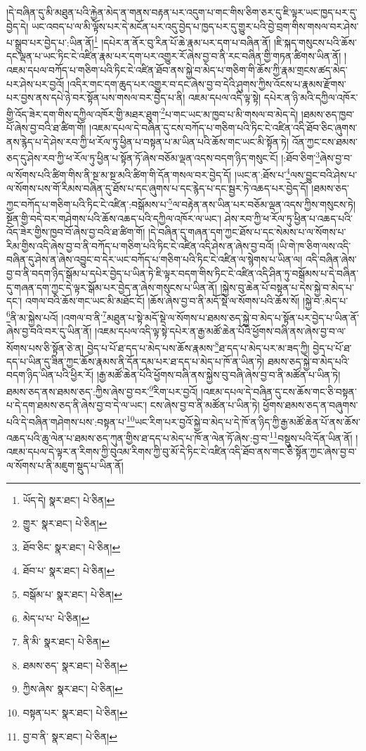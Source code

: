 །དེ་བཞིན་དུ་མི་མཐུན་པའི་རྐྱེན་མེད་ན་གནས་བརྟན་པར་འདུག་པ་གང་གིས་ཅིག་ཅར་དུ་ཇི་ལྟར་ཡང་ཁྱད་པར་དུ་བྱེད་དེ། ཡང་འབད་པ་ལ་མི་ལྟོས་པར་དེ་མངོན་པར་འདུ་བྱེད་པ་ཁྱད་པར་དུ་གྱུར་པའི་བྱེ་བྲག་གིས་གསལ་བར་ཤེས་པ་སྒྲུབ་པར་བྱེད་པ་:ཡིན་ནོ།\footnote{ཡོད་དེ།  སྣར་ཐང་།  པེ་ཅིན། } །དཔེར་ན་ནོར་བུ་རིན་པོ་ཆེ་རྣམ་པར་དག་པ་བཞིན་ནོ། །ཇི་སྐད་གསུངས་པའི་ཆོས་དང་ལྡན་པ་ཡང་ཏིང་ངེ་འཛིན་རྣམ་པར་དག་པར་འགྱུར་རོ་ཞེས་བྱ་བ་ནི་རང་བཞིན་གྱི་གཏན་ཚིགས་ཡིན་ནོ། །འཇམ་དཔལ་བཀོད་པ་གཅིག་པའི་ཏིང་ངེ་འཛིན་ཐོབ་ནས་སྐྱེ་བ་མེད་པ་གཅིག་གི་ཆོས་ཀྱི་རྣམ་གྲངས་ཚད་མེད་པར་ཤེས་པར་བྱའོ། །འདིར་གང་དག་ཆུད་པར་འགྱུར་བ་དང་ཞེས་བྱ་བ་དེའི་ཤུགས་ཀྱིས་འོངས་པ་རྣམས་རྫོགས་པར་བྱས་ནས་དཔེ་ཉེ་བར་སྟོན་པས་གསལ་བར་བྱེད་པ་ནི། འཇམ་དཔལ་འདི་ལྟ་སྟེ། དཔེར་ན་ཉི་མའི་དཀྱིལ་འཁོར་གྱི་འོད་ཟེར་དག་གིས་དཀྱིལ་འཁོར་གྱི་མཐར་ཐུག་\footnote{གྱུར་  སྣར་ཐང་།  པེ་ཅིན། }པ་གང་ཡང་མ་ཁྱབ་པ་མི་གསལ་བ་མེད་དེ། །ཐམས་ཅད་ཁྱབ་པོ་ཞེས་བྱ་བའི་ཐ་ཚིག་གོ། །འཇམ་དཔལ་དེ་བཞིན་དུ་ངས་བཀོད་པ་གཅིག་པའི་ཏིང་ངེ་འཛིན་འདི་ཐོབ་ཅིང་ཞུགས་ནས་རྙེད་པ་དེ་ཤེས་རབ་ཀྱི་ཕ་རོལ་ཏུ་ཕྱིན་པ་བསྟན་པ་མ་ཡིན་པའི་ཆོས་གང་ཡང་མི་སྟོན་ཏེ། འོན་ཀྱང་ངས་ཐམས་ཅད་དུ་ཤེས་རབ་ཀྱི་ཕ་རོལ་ཏུ་ཕྱིན་པ་སྟོན་ཏོ་ཞེས་བཅོམ་ལྡན་འདས་བདག་ཉིད་གསུང་ངོ། །:ཐོབ་ཅིག་\footnote{ཐོབ་ཅིང་  སྣར་ཐང་།  པེ་ཅིན། }ཞེས་བྱ་བ་ལ་སོགས་པའི་ཚིག་གིས་ནི་སྔ་མ་སྔ་མའི་ཚིག་གི་དོན་གསལ་བར་བྱེད་དོ། །ཡང་ན་:ཐོས་པ་\footnote{ཐོབ་པ་  སྣར་ཐང་།  པེ་ཅིན། }ལས་བྱུང་བའི་ཤེས་པ་ལ་སོགས་པས་གོ་རིམས་བཞིན་དུ་ཐོས་པ་དང་ཞུགས་པ་དང་རྙེད་པ་དང་སྦྱར་ཏེ་འཆད་པར་བྱེད་དོ། །ཐམས་ཅད་ཀྱང་བཀོད་པ་གཅིག་པའི་ཏིང་ངེ་འཛིན་:བསྒོམས་པ་\footnote{བསྒོམ་པ་  སྣར་ཐང་།  པེ་ཅིན། }ལ་བརྟེན་ནས་ཡིན་པར་བཅོམ་ལྡན་འདས་ཀྱིས་གསུངས་ཏེ། སྔོན་གྱི་བདེ་བར་གཤེགས་པའི་ཆོས་འཆད་པའི་དཀྱིལ་འཁོར་ལ་ཡང་། ཤེས་རབ་ཀྱི་ཕ་རོལ་ཏུ་ཕྱིན་པ་འཆད་པའི་འོད་ཟེར་གྱིས་ཁྱབ་བོ་ཞེས་བྱ་བའི་ཐ་ཚིག་གོ། །དེ་བཞིན་དུ་གཞན་དག་ཀྱང་ཐོས་པ་དང་སེམས་པ་ལ་སོགས་པ་རིམ་གྱིས་འདི་ཞེས་བྱ་བ་ནི་བཀོད་པ་གཅིག་པའི་ཏིང་ངེ་འཛིན་འདི་ཤེས་ན་ཞེས་བྱ་བའོ། །ཡི་གེ་ཁ་ཅིག་ལས་འདི་བཞིན་དུ་ཤེས་ན་ཞེས་འབྱུང་བ་དེར་ཡང་བཀོད་པ་གཅིག་པའི་ཏིང་ངེ་འཛིན་ལ་སྙེགས་པ་ཡིན་ལ། འདི་བཞིན་ཞེས་བྱ་བ་ནི་བདག་ཉིད་སྒོམ་པ་དཔེར་བྱེད་པ་ཡིན་ཏེ་ཇི་ལྟར་བདག་གིས་ཏིང་ངེ་འཛིན་འདི་ཤིན་ཏུ་བསྒོམས་པ་དེ་བཞིན་དུ་གཞན་དག་ཀྱང་དེ་ལྟར་སྒོམ་པར་བྱེད་ན་ཞེས་གསུངས་པ་ཡིན་ནོ། །སྐྱེས་བུ་ཆེན་པོ་བསྟན་པ་དེས་སྐྱེ་བ་མེད་པ་དང་། འགལ་བའི་ཆོས་གང་ཡང་མི་མཐོང་ངོ། །ཆོས་ཞེས་བྱ་བ་ནི་མདོ་སྡེ་ལ་སོགས་པའི་ཆོས་སོ། །སྐྱེ་བ་:མེད་པ་\footnote{མེད་པ་པ་  པེ་ཅིན། }ནི་མ་སྐྱེས་པའོ། །འགལ་བ་ནི་\footnote{ནི་མི་  སྣར་ཐང་།  པེ་ཅིན། }མཐུན་པ་སྟེ་མདོ་སྡེ་ལ་སོགས་པ་ཐམས་ཅད་སྐྱེ་བ་མེད་པ་སྟོན་པར་བྱེད་པ་ཡིན་ནོ་ཞེས་བྱ་བའི་བར་དུ་ཡིན་ནོ། །འཇམ་དཔལ་འདི་ལྟ་སྟེ་དཔེར་ན་རྒྱ་མཚོ་ཆེན་པོའི་ཕྱོགས་བཞི་ནས་ཞེས་བྱ་བ་ལ་སོགས་པས་ཅི་སྟོན་ཅེ་ན། བྱེད་པ་པོ་ཐ་དད་པ་མེད་པས་ཆོས་རྣམས་\footnote{ཐམས་ཅད་  སྣར་ཐང་།  པེ་ཅིན། }ཐ་དད་པ་མེད་པར་མ་ཟད་ཀྱི། བྱེད་པ་པོ་ཐ་དད་པ་ཡིན་དུ་ཟིན་ཀྱང་ཆོས་རྣམས་ནི་དོན་དམ་པར་ཐ་དད་པ་མེད་པ་ཁོ་ན་ཡིན་ཏེ། ཐམས་ཅད་སྐྱེ་བ་མེད་པའི་བདག་ཉིད་ཡིན་པའི་ཕྱིར་རོ། །རྒྱ་མཚོ་ཆེན་པོའི་ཕྱོགས་བཞི་ནས་སྐྱེས་བུ་བཞི་ཞེས་བྱ་བ་ནི་མཚོན་པ་ཡིན་ཏེ། ཐམས་ཅད་ནས་ཐམས་ཅད་:ཀྱིས་ཞེས་བྱ་བར་\footnote{ཀྱིས་ཞེས་  སྣར་ཐང་།  པེ་ཅིན། }རིག་པར་བྱའོ། །འཇམ་དཔལ་དེ་བཞིན་དུ་ངས་ཆོས་གང་ཅི་བསྟན་པ་དེ་དག་ཐམས་ཅད་ནི་ཞེས་བྱ་བ་དེ་ལ་ཡང་། ངས་ཞེས་བྱ་བ་ནི་མཚོན་པ་ཡིན་ཏེ། ཕྱོགས་ཐམས་ཅད་ན་བཞུགས་པའི་དེ་བཞིན་གཤེགས་པས་:བསྟན་པ་\footnote{བསྟན་པར་  སྣར་ཐང་།  པེ་ཅིན། }ཡང་རིག་པར་བྱའོ་སྐྱེ་བ་མེད་པ་དེ་ཁོ་ན་ཉིད་ཀྱི་རྒྱ་མཚོ་ཆེན་པོ་ནས་ཆོས་འཆད་པའི་ཆུ་ལེན་པ་ཐམས་ཅད་ཀུན་གྱིས་ཐ་དད་པ་མེད་པ་ཁོ་ན་ལེན་ཏོ་ཞེས་:བྱ་བ་\footnote{བྱ་བ་ནི་  སྣར་ཐང་།  པེ་ཅིན། }བསྡུས་པའི་དོན་ཡིན་ནོ། །འཇམ་དཔལ་དེ་ལྟར་ན་རིགས་ཀྱི་བུའམ་རིགས་ཀྱི་བུ་མོ་དེ་ཏིང་ངེ་འཛིན་འདི་ཐོབ་ནས་གང་ཅི་སྟོན་ཀྱང་ཞེས་བྱ་བ་ལ་སོགས་པ་ནི་མཇུག་སྡུད་པ་ཡིན་ནོ། 